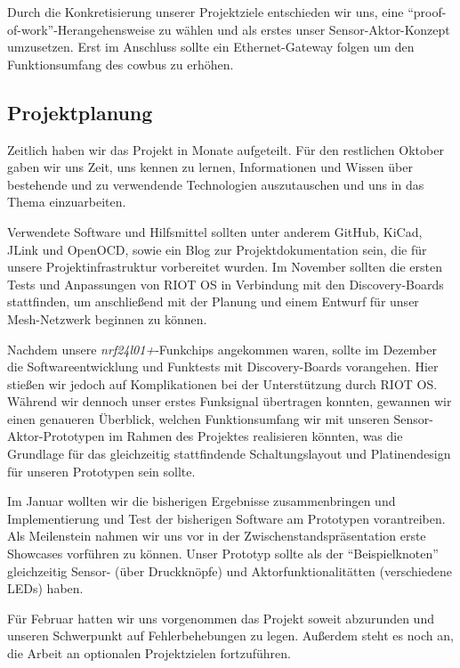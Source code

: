 \documentclass{IEEEtran}
\begin{document}
    Durch die Konkretisierung unserer Projektziele entschieden wir uns, eine 
    \enquote{proof-of-work}-Herangehensweise zu wählen und als erstes unser 
    Sensor-Aktor-Konzept umzusetzen. Erst im Anschluss sollte ein 
    Ethernet-Gateway folgen um den Funktionsumfang des cowbus zu erhöhen.

    \subsection{Projektplanung}
    Zeitlich haben wir das Projekt in Monate aufgeteilt. Für den restlichen Oktober 
    gaben wir uns Zeit, uns kennen zu lernen, Informationen und Wissen über bestehende 
    und zu verwendende Technologien auszutauschen und uns in das Thema einzuarbeiten.
    
    Verwendete Software und Hilfsmittel sollten unter anderem GitHub, KiCad, JLink 
    und OpenOCD, sowie ein Blog zur Projektdokumentation sein, die für unsere 
    Projektinfrastruktur vorbereitet wurden.
    Im November sollten die ersten Tests und Anpassungen von RIOT OS in Verbindung 
    mit den Discovery-Boards stattfinden, um anschließend mit der Planung und einem 
    Entwurf für unser Mesh-Netzwerk beginnen zu können.
   
    Nachdem unsere \emph{nrf24l01+}-Funkchips angekommen waren, sollte im Dezember 
    die Softwareentwicklung und  Funktests mit Discovery-Boards vorangehen.
    Hier stießen wir jedoch auf Komplikationen bei der Unterstützung durch RIOT OS. 
    Während wir dennoch unser erstes Funksignal übertragen konnten, gewannen wir 
    einen genaueren Überblick, welchen Funktionsumfang wir mit unseren 
    Sensor-Aktor-Prototypen im Rahmen des Projektes realisieren könnten, was die 
    Grundlage für das gleichzeitig stattfindende Schaltungslayout und 
    Platinendesign für unseren Prototypen sein sollte.
    
    Im Januar wollten wir die bisherigen Ergebnisse zusammenbringen und  
    Implementierung und Test der bisherigen Software am Prototypen vorantreiben. 
    Als Meilenstein nahmen wir uns vor in der Zwischenstandspräsentation erste 
    Showcases vorführen zu können. Unser Prototyp sollte als der 
    \enquote{Beispielknoten} gleichzeitig Sensor- (über Druckknöpfe) und 
    Aktorfunktionalitätten (verschiedene LEDs) haben.
    
    Für Februar hatten wir uns vorgenommen das Projekt soweit abzurunden und 
    unseren Schwerpunkt auf Fehlerbehebungen zu legen. Außerdem steht es noch an, 
    die Arbeit an optionalen Projektzielen fortzuführen. 
\end{document}
